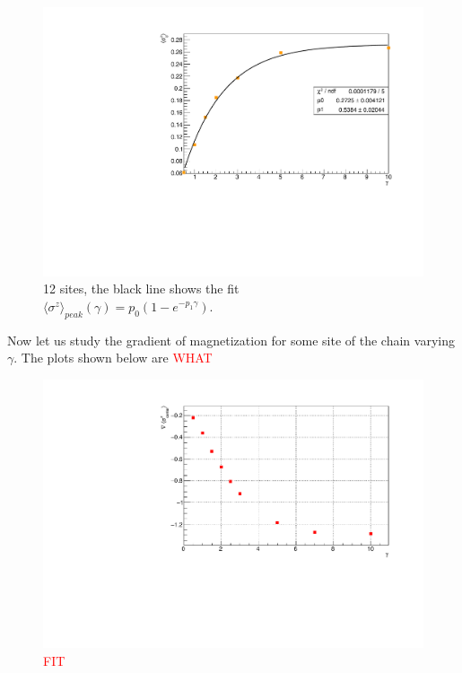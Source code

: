 \begin{figure}[H]
    \centering
    \includegraphics[scale=0.7]{Figures/12sites/FIT_12sites_3rdLMvsGamma.pdf}
    \caption{12 sites, the black line shows the fit \\$\langle\sigma^z\rangle_{peak}(\gamma) = p_0(1-e^{-p_1\gamma})$.}
    \label{fig:FIT12sites_3rdSiteVSgamma}
\end{figure}

Now let us study the gradient of magnetization for some site of the chain varying $\gamma$. The plots shown below are \textcolor{red}{WHAT}

\begin{figure}[H]
    \centering
    \includegraphics[scale=0.7]{Figures/8sites_comparison/8sites_gradLM_centerChainVSgamma.pdf}
    \caption{\textcolor{red}{FIT}}
    \label{fig:my_label}
\end{figure}

